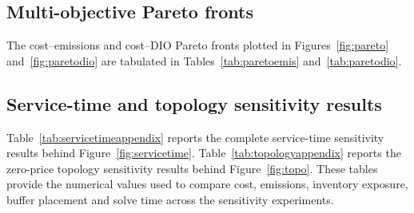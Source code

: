 \documentclass[preprint,12pt,authoryear]{elsarticle}
\begin{document}


\subsection{Multi-objective Pareto fronts}
The cost--emissions and cost--DIO Pareto fronts plotted in Figures~\ref{fig:pareto} and~\ref{fig:paretodio} are tabulated in Tables~\ref{tab:paretoemis} and~\ref{tab:paretodio}.




\subsection{Service-time and topology sensitivity results}
Table~\ref{tab:servicetimeappendix} reports the complete service-time sensitivity results behind Figure~\ref{fig:servicetime}. Table~\ref{tab:topologyappendix} reports the zero-price topology sensitivity results behind Figure~\ref{fig:topo}. These tables provide the numerical values used to compare cost, emissions, inventory exposure, buffer placement and solve time across the sensitivity experiments.




\clearpage


\end{document}
